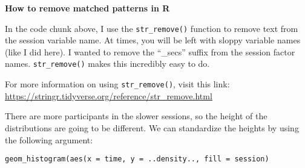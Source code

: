 \documentclass[
]{book}
\begin{document}
\begin{blackbox}

\begin{center}
\textbf{How to remove matched patterns in R}

\end{center}

In the code chunk above, I use the \texttt{str\_remove()} function to remove text from the session variable name. At times, you will be left with sloppy variable names (like I did here). I wanted to remove the ``\_secs'' suffix from the session factor names. \texttt{str\_remove()} makes this incredibly easy to do.

For more information on using \texttt{str\_remove()}, visit this link: \url{https://stringr.tidyverse.org/reference/str_remove.html}

\end{blackbox}

There are more participants in the slower sessions, so the height of the distributions are going to be different. We can standardize the heights by using the following argument:

\texttt{geom\_histogram(aes(x\ =\ time,\ y\ =\ ..density..,\ fill\ =\ session)}
\end{document}
